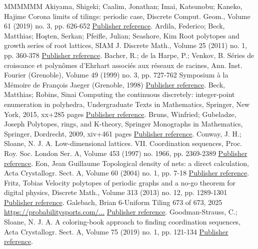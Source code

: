\begin{thebibliography}{MMMMMM}
 Akiyama, Shigeki; Caalim, Jonathan; Imai, Katsunobu; Kaneko, Hajime Corona limits of tilings: periodic case, Discrete Comput. Geom., Volume 61 (2019) no. 3, pp. 626-652 \href{https://alco.centre-mersenne.org/articles/10.5802/alco.445/#ACIK}{Publisher reference}.
 Ardila, Federico; Beck, Matthias; Hoşten, Serkan; Pfeifle, Julian; Seashore, Kim Root polytopes and growth series of root lattices, SIAM J. Discrete Math., Volume 25 (2011) no. 1, pp. 360-378 \href{https://alco.centre-mersenne.org/articles/10.5802/alco.445/#ABHPS}{Publisher reference}.
 Bacher, R.; de la Harpe, P.; Venkov, B. Séries de croissance et polynômes d’Ehrhart associés aux réseaux de racines, Ann. Inst. Fourier (Grenoble), Volume 49 (1999) no. 3, pp. 727-762 Symposium à la Mémoire de François Jaeger (Grenoble, 1998) \href{https://alco.centre-mersenne.org/articles/10.5802/alco.445/#BHV99}{Publisher reference}.
 Beck, Matthias; Robins, Sinai Computing the continuous discretely: integer-point enumeration in polyhedra, Undergraduate Texts in Mathematics, Springer, New York, 2015, xx+285 pages \href{https://alco.centre-mersenne.org/articles/10.5802/alco.445/#BR}{Publisher reference}.
 Bruns, Winfried; Gubeladze, Joseph Polytopes, rings, and K-theory, Springer Monographs in Mathematics, Springer, Dordrecht, 2009, xiv+461 pages \href{https://alco.centre-mersenne.org/articles/10.5802/alco.445/#BG2009}{Publisher reference}.
 Conway, J. H.; Sloane, N. J. A. Low-dimensional lattices. VII. Coordination sequences, Proc. Roy. Soc. London Ser. A, Volume 453 (1997) no. 1966, pp. 2369-2389 \href{https://alco.centre-mersenne.org/articles/10.5802/alco.445/#CS97}{Publisher reference}.
 Eon, Jean Guillaume Topological density of nets: a direct calculation, Acta Crystallogr. Sect. A, Volume 60 (2004) no. 1, pp. 7-18 \href{https://alco.centre-mersenne.org/articles/10.5802/alco.445/#Eon04}{Publisher reference}.
 Fritz, Tobias Velocity polytopes of periodic graphs and a no-go theorem for digital physics, Discrete Math., Volume 313 (2013) no. 12, pp. 1289-1301 \href{https://alco.centre-mersenne.org/articles/10.5802/alco.445/#Fri13}{Publisher reference}.
 Galebach, Brian 6-Uniform Tiling 673 of 673, 2025 \url{https://probabilitysports.com/...} \href{https://alco.centre-mersenne.org/articles/10.5802/alco.445/#Gal}{Publisher reference}.
 Goodman-Strauss, C.; Sloane, N. J. A. A coloring-book approach to finding coordination sequences, Acta Crystallogr. Sect. A, Volume 75 (2019) no. 1, pp. 121-134 \href{https://alco.centre-mersenne.org/articles/10.5802/alco.445/#GS19}{Publisher reference}.

\end{thebibliography}
